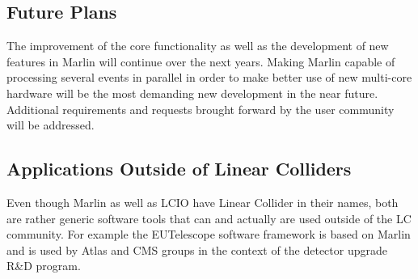 \subsection{Future Plans}
The improvement of the core functionality as well as the development of new features in Marlin will continue over the next years. Making Marlin capable of processing several events in parallel in order to make better use of new multi-core hardware will be the most demanding new development in the near future. Additional requirements and requests brought forward by the user community will be addressed.


\subsection{Applications Outside of Linear Colliders}
Even though Marlin as well as LCIO have Linear Collider in their names, both are rather generic software tools that can and actually are used outside of the LC community. For example the EUTelescope software framework is based on Marlin and is used by Atlas and CMS groups in the context of the detector upgrade R\&D program.
